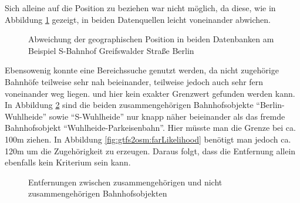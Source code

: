 Sich alleine auf die Position zu beziehen war nicht möglich, da diese, wie in Abbildung \ref{fig:gtfs2osm:geoDiff} gezeigt, in beiden Datenquellen leicht voneinander abwichen.
\begin{figure}[htb]
   \centering
   \caption{Abweichung der geographischen Position in beiden Datenbanken am Beispiel S-Bahnhof Greifswalder Straße Berlin}
   \label{fig:gtfs2osm:geoDiff}
 \end{figure}
Ebensowenig konnte eine Bereichssuche genutzt werden, da nicht zugehörige Bahnhöfe teilweise sehr nah beieinander, teilweise jedoch auch sehr fern voneinander weg liegen. und hier kein exakter Grenzwert gefunden werden kann. In Abbildung \ref{fig:gtfs2osm:nearNameDiff} sind die beiden zusammengehörigen Bahnhofsobjekte ``Berlin-Wuhlheide'' sowie ``S-Wuhlheide'' nur knapp näher beieinander als das fremde Bahnhofsobjekt ``Wuhlheide-Parkeisenbahn''. Hier müsste man die Grenze bei ca. 100m ziehen. In Abbildung \ref{fig:gtfs2osm:farLikelihood} benötigt man jedoch ca. 120m um die Zugehörigkeit zu erzeugen. Daraus folgt, dass die Entfernung allein ebenfalls kein Kriterium sein kann.
\begin{figure}[htb]
   \centering
   \caption{Entfernungen zwischen zusammengehörigen und nicht zusammengehörigen Bahnhofsobjekten}
   \label{fig:gtfs2osm:nearNameDiff}
 \end{figure}
